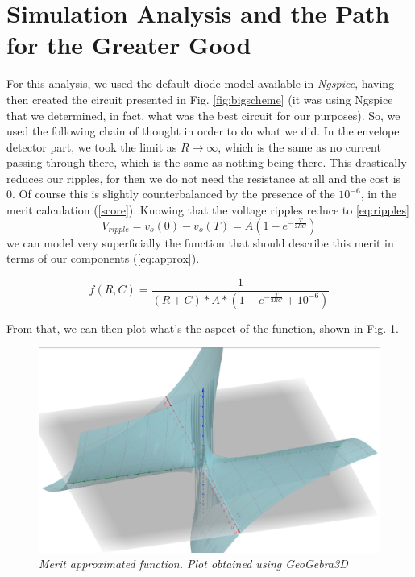 \section{Simulation Analysis and the Path for the Greater Good}

For this analysis, we used the default diode model available in \textit{Ngspice}, having then created the circuit presented in Fig. \ref{fig:bigscheme} (it was using Ngspice that we determined, in fact, what was the best circuit for our purposes). So, we used the following chain of thought in order to do what we did. In the envelope detector part, we took the limit as $R \rightarrow \infty$, which is the same as no current passing through there, which is the same as nothing being there. This drastically reduces our ripples, for then we do not need the resistance at all and the cost is 0. Of course this is slightly counterbalanced by the presence of the $10^{-6}$, in the merit calculation (\eqref{score}).  Knowing that the voltage ripples reduce to \eqref{eq:ripples}
\begin{equation}
    V_{ripple} = v_o(0) - v_o(T) = A \left(1 - e^{-\frac{T}{2RC}}\right)
    \label{eq:ripples}
\end{equation}
we can model very superficially the function that should describe this merit in terms of our components (\eqref{eq:approx}).

\begin{equation}
    f(R,C) = \frac{1}{(R+C)*A*\left(1 - e^{-\frac{T}{2RC}}+ 10^{-6}\right )}
    \label{eq:approx}
\end{equation}

From that, we can then plot what's the aspect of the function, shown in Fig. \ref{fig:plot}.

\begin{figure}[H]
    \centering
    \includegraphics[width = 0.85\linewidth]{cost.png}
        \caption{\textit{Merit approximated function. Plot obtained using GeoGebra3D}}
    \label{fig:plot}
\end{figure}

